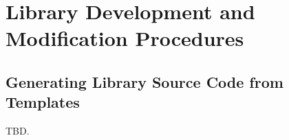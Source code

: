 \chapter{Library Development and Modification Procedures}
\label{cbpc0}


\section{Generating Library Source Code from Templates}
\label{cbpc0:sgsc0}

TBD.



